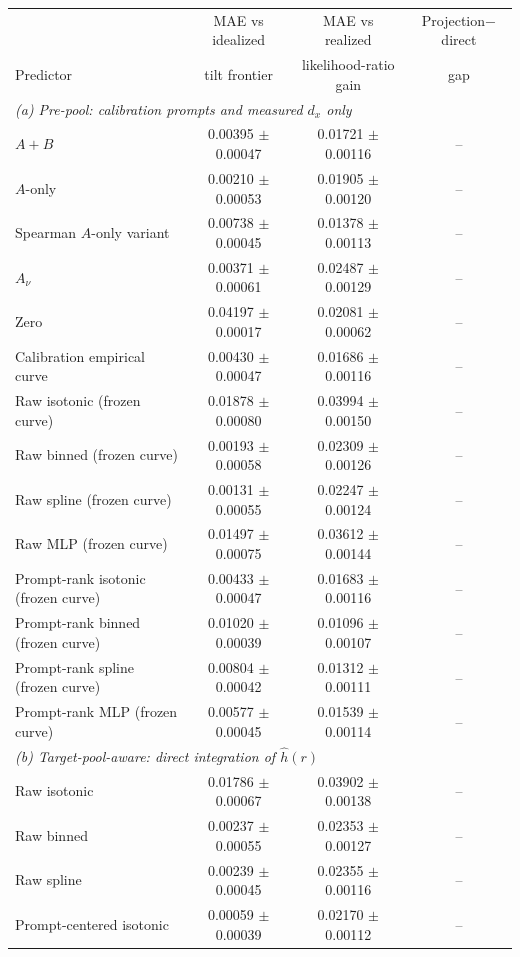 \begin{tabular}{lccc}
\toprule
 & MAE vs idealized & MAE vs realized & Projection$-$direct \\
Predictor & tilt frontier & likelihood-ratio gain & gap \\
\midrule
\multicolumn{4}{l}{\textit{(a) Pre-pool: calibration prompts and measured $d_x$ only}} \\
$A{+}B$ & 0.00395 $\pm$ 0.00047 & 0.01721 $\pm$ 0.00116 & -- \\
$A$-only & 0.00210 $\pm$ 0.00053 & 0.01905 $\pm$ 0.00120 & -- \\
Spearman $A$-only variant & 0.00738 $\pm$ 0.00045 & 0.01378 $\pm$ 0.00113 & -- \\
$A_\nu$ & 0.00371 $\pm$ 0.00061 & 0.02487 $\pm$ 0.00129 & -- \\
Zero & 0.04197 $\pm$ 0.00017 & 0.02081 $\pm$ 0.00062 & -- \\
Calibration empirical curve & 0.00430 $\pm$ 0.00047 & 0.01686 $\pm$ 0.00116 & -- \\
Raw isotonic (frozen curve) & 0.01878 $\pm$ 0.00080 & 0.03994 $\pm$ 0.00150 & -- \\
Raw binned (frozen curve) & 0.00193 $\pm$ 0.00058 & 0.02309 $\pm$ 0.00126 & -- \\
Raw spline (frozen curve) & 0.00131 $\pm$ 0.00055 & 0.02247 $\pm$ 0.00124 & -- \\
Raw MLP (frozen curve) & 0.01497 $\pm$ 0.00075 & 0.03612 $\pm$ 0.00144 & -- \\
Prompt-rank isotonic (frozen curve) & 0.00433 $\pm$ 0.00047 & 0.01683 $\pm$ 0.00116 & -- \\
Prompt-rank binned (frozen curve) & 0.01020 $\pm$ 0.00039 & 0.01096 $\pm$ 0.00107 & -- \\
Prompt-rank spline (frozen curve) & 0.00804 $\pm$ 0.00042 & 0.01312 $\pm$ 0.00111 & -- \\
Prompt-rank MLP (frozen curve) & 0.00577 $\pm$ 0.00045 & 0.01539 $\pm$ 0.00114 & -- \\
\midrule
\multicolumn{4}{l}{\textit{(b) Target-pool-aware: direct integration of $\hat h(r)$}} \\
Raw isotonic & 0.01786 $\pm$ 0.00067 & 0.03902 $\pm$ 0.00138 & -- \\
Raw binned & 0.00237 $\pm$ 0.00055 & 0.02353 $\pm$ 0.00127 & -- \\
Raw spline & 0.00239 $\pm$ 0.00045 & 0.02355 $\pm$ 0.00116 & -- \\
Prompt-centered isotonic & 0.00059 $\pm$ 0.00039 & 0.02170 $\pm$ 0.00112 & -- \\

\end{tabular}
